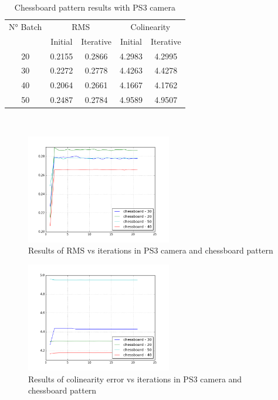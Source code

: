 \documentclass[journal]{IEEEtran}
\begin{document}
\begin{table}[h]
\centering
\caption{Chessboard pattern results with PS3 camera}
\begin{tabular}{ |c||c|c|c|c|  }
 \hline
 N° Batch & \multicolumn{2}{c|}{RMS} & \multicolumn{2}{c|}{Colinearity}\\
 \cline{2-5}
 & Initial & Iterative & Initial & Iterative \\
 \hline
 20        & 0.2155 & 0.2866 & 4.2983 & 4.2995 \\
 30        & 0.2272 & 0.2778 & 4.4263 & 4.4278 \\
 40        & 0.2064 & 0.2661 & 4.1667 & 4.1762 \\
 50        & 0.2487 & 0.2784 & 4.9589 & 4.9507 \\
 \hline
\end{tabular}
\\
\end{table}

\begin{figure}[H]
\centering
\includegraphics[width=2.5in]{_img/report_4/img_results_ps3_chessboard.png}
\caption{Results of RMS vs iterations in PS3 camera and chessboard pattern}
\end{figure}

\begin{figure}[H]
\centering
\includegraphics[width=2.5in]{_img/report_4/img_results_ps3_colinearity_chessboard.png}
\caption{Results of colinearity error vs iterations in PS3 camera and chessboard pattern}
\end{figure}
\end{document}
